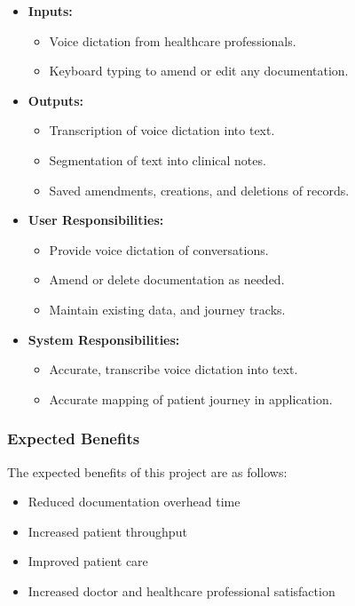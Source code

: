 \documentclass[12pt]{article}
\begin{document}
\begin{itemize}
  \item \textbf{Inputs:}
  \begin{itemize}
    \item Voice dictation from healthcare professionals.
    \item Keyboard typing to amend or edit any documentation.
  \end{itemize}
  \item \textbf{Outputs:}
  \begin{itemize}
    \item Transcription of voice dictation into text.
    \item Segmentation of text into clinical notes.
    \item Saved amendments, creations, and deletions of records.
  \end{itemize}
  \item \textbf{User Responsibilities:}
  \begin{itemize}
    \item Provide voice dictation of conversations.
    \item Amend or delete documentation as needed.
    \item Maintain existing data, and journey tracks.
  \end{itemize}
  \item \textbf{System Responsibilities:}
  \begin{itemize}
    \item Accurate, transcribe voice dictation into text.
    \item Accurate mapping of patient journey in application.
  \end{itemize}
\end{itemize}
\subsubsection{Expected Benefits} \label{sec_ExpectedBenefits}

The expected benefits of this project are as follows:
\begin{itemize}
  \item Reduced documentation overhead time
  \item Increased patient throughput
  \item Improved patient care
  \item Increased doctor and healthcare professional satisfaction
\end{itemize}
\end{document}
